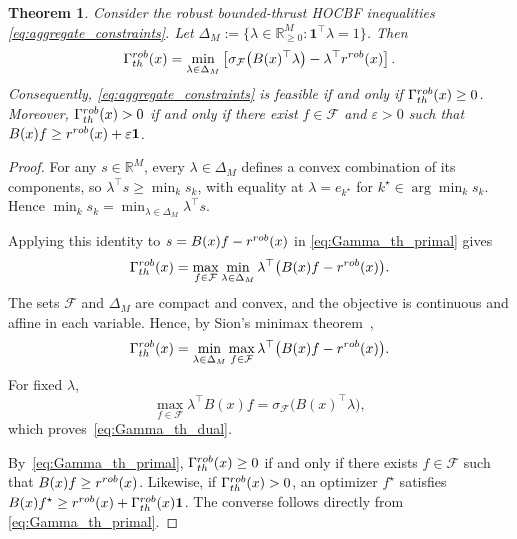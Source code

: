 \documentclass[10pt,a4paper]{amsart}
\newtheorem{theorem}{Theorem}[section]
\begin{document}
\begin{theorem}\label{thm:robust_aggregate_feasibility}
Consider the robust bounded-thrust HOCBF inequalities
\eqref{eq:aggregate_constraints}. Let
$\Delta_M:=\{\lambda\in\mathbb R_{\ge0}^M:
\mathbf 1^\top\lambda=1\}$. Then
\begin{equation}
    \Gamma_{\rm th}^{\rm rob}(x)
    =
    \min_{\lambda\in\Delta_M}
    \left[
        \sigma_{\mathcal F}\big(B(x)^\top\lambda\big)
        -
        \lambda^\top r^{\rm rob}(x)
    \right].
    \label{eq:Gamma_th_dual}
\end{equation}
Consequently, \eqref{eq:aggregate_constraints} is feasible
if and only if $\Gamma_{\rm th}^{\rm rob}(x)\ge0$.
Moreover, $\Gamma_{\rm th}^{\rm rob}(x)>0$ if and only if
there exist $f\in\mathcal F$ and $\varepsilon>0$ such that
$B(x)f\ge r^{\rm rob}(x)+\varepsilon\mathbf 1$.
\end{theorem}

\begin{proof}
For any $s\in\mathbb R^M$, every $\lambda\in\Delta_M$
defines a convex combination of its components, so
$\lambda^\top s\ge\min_k s_k$, with equality at
$\lambda=e_{k^\star}$ for
$k^\star\in\arg\min_k s_k$. Hence
$\min_k s_k
    =
    \min_{\lambda\in\Delta_M}\lambda^\top s$.

Applying this identity to
$s=B(x)f-r^{\rm rob}(x)$ in
\eqref{eq:Gamma_th_primal} gives
\[
    \Gamma_{\rm th}^{\rm rob}(x)
    =
    \max_{f\in\mathcal F}
    \min_{\lambda\in\Delta_M}
    \lambda^\top\big(B(x)f-r^{\rm rob}(x)\big).
\]
The sets $\mathcal F$ and $\Delta_M$ are compact and convex,
and the objective is continuous and affine in each variable.
Hence, by Sion's minimax theorem~\cite{sion1958general},
\[
    \Gamma_{\rm th}^{\rm rob}(x)
    =
    \min_{\lambda\in\Delta_M}
    \max_{f\in\mathcal F}
    \lambda^\top\big(B(x)f-r^{\rm rob}(x)\big).
\]
For fixed $\lambda$,
\[
    \max_{f\in\mathcal F}\lambda^\top B(x)f
    =
    \sigma_{\mathcal F}\big(B(x)^\top\lambda\big),
\]
which proves~\eqref{eq:Gamma_th_dual}.

By~\eqref{eq:Gamma_th_primal},
$\Gamma_{\rm th}^{\rm rob}(x)\ge0$ if and only if there exists
$f\in\mathcal F$ such that
$B(x)f\ge r^{\rm rob}(x)$.
Likewise, if $\Gamma_{\rm th}^{\rm rob}(x)>0$, an optimizer
$f^\star$ satisfies
$B(x)f^\star\ge r^{\rm rob}(x)
+\Gamma_{\rm th}^{\rm rob}(x)\mathbf 1$.
The converse follows directly from
\eqref{eq:Gamma_th_primal}.
\end{proof}

\medskip
\end{document}
